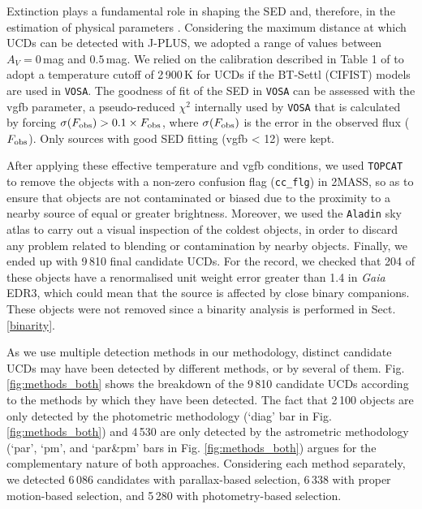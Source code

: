 Extinction plays a fundamental role in shaping the SED and, therefore, in the estimation of physical parameters \citep{extinction_laugalys, extinction_straizys}. Considering the maximum distance at which UCDs can be detected with J-PLUS, we adopted a range of values between $A_V=0$\,mag and $0.5$\,mag. We relied on the calibration described in Table 1 of \citet{solano2021} to adopt a temperature cutoff of 2\,900\,K for UCDs if the BT-Settl (CIFIST) models are used in \texttt{VOSA}. The goodness of fit of the SED in \texttt{VOSA} can be assessed with the vgfb parameter, a pseudo-reduced $\chi^2$ internally used by \texttt{VOSA} that is calculated by forcing $\sigma(F_{\rm obs}) > 0.1\times F_{\rm obs}$, where $\sigma(F_{\rm obs})$ is the error in the observed flux ($F_{\rm obs}$). Only sources with good SED fitting (vgfb < 12) were kept.

After applying these effective temperature and vgfb conditions, we used \texttt{TOPCAT} to remove the objects with a non-zero confusion flag (\texttt{cc\_flg}) in 2MASS, so as to ensure that objects are not contaminated or biased due to the proximity to a nearby source of equal or greater brightness. Moreover, we used the \texttt{Aladin} sky atlas \citep{aladin} to carry out a visual inspection of the coldest objects, in order to discard any problem related to blending or contamination by nearby objects. Finally, we ended up with 9\,810 final candidate UCDs. For the record, we checked that 204 of these objects have a renormalised unit weight error \citep[RUWE; ][]{lindegren2018} greater than 1.4 in \textit{Gaia} EDR3, which could mean that the source is affected by close binary companions. These objects were not removed since a binarity analysis is performed in Sect. \ref{binarity}.

As we use multiple detection methods in our methodology, distinct candidate UCDs may have been detected by different methods, or by several of them. Fig. \ref{fig:methods_both} shows the breakdown of the 9\,810 candidate UCDs according to the methods by which they have been detected. The fact that 2\,100 objects are only detected by the photometric methodology (`diag' bar in Fig. \ref{fig:methods_both}) and 4\,530 are only detected by the astrometric methodology (`par', `pm', and `par\&pm' bars in Fig. \ref{fig:methods_both}) argues for the complementary nature of both approaches. Considering each method separately, we detected 6\,086 candidates with parallax-based selection, 6\,338 with proper motion-based selection, and 5\,280 with photometry-based selection.

